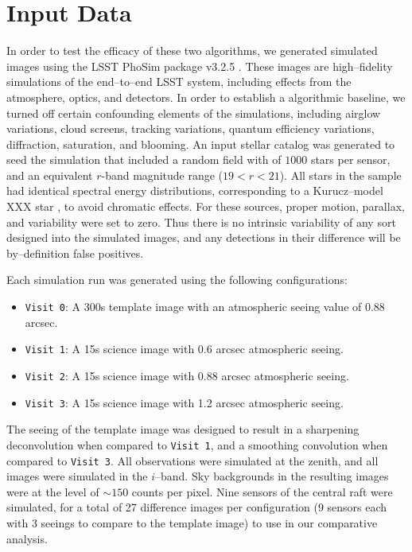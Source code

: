 \documentclass[floatfix, apj]{emulateapj}
\begin{document}
\section{Input Data}

In order to test the efficacy of these two algorithms, we generated simulated images using the LSST PhoSim package v3.2.5 \cite{phosim}.
These images are high--fidelity simulations of the end--to--end LSST system, including effects from the atmosphere, optics, and detectors.
In order to establish a algorithmic baseline, we turned off certain confounding elements of the simulations, including airglow variations, cloud screens, tracking variations, quantum efficiency variations, diffraction, saturation, and blooming.
An input stellar catalog was generated to seed the simulation that included a random field with of $1000$ stars per sensor, and an equivalent $r$-band magnitude range ($19<r<21$).
All stars in the sample had identical spectral energy distributions, corresponding to a Kurucz--model XXX star \cite{kurucz}, to avoid chromatic effects.
For these sources, proper motion, parallax, and variability were set to zero.
Thus there is no intrinsic variability of any sort designed into the simulated images, and any detections in their difference will be by--definition false positives.

Each simulation run was generated using the following configurations:
\begin{itemize}
\item {\tt Visit 0}: A 300s template image with an atmospheric seeing value of 0.88 arcsec.
\item {\tt Visit 1}: A 15s science image with 0.6 arcsec atmospheric seeing.
\item {\tt Visit 2}: A 15s science image with 0.88 arcsec atmospheric seeing.
\item {\tt Visit 3}: A 15s science image with 1.2 arcsec atmospheric seeing.
\end{itemize}
The seeing of the template image was designed to result in a sharpening deconvolution when compared to {\tt Visit 1}, and a smoothing convolution when compared to {\tt Visit 3}.
All observations were simulated at the zenith, and all images were simulated in the $i$--band.
Sky backgrounds in the resulting images were at the level of $\sim 150$ counts per pixel.
Nine sensors of the central raft were simulated, for a total of 27 difference images per configuration (9 sensors each with 3 seeings to compare to the template image) to use in our comparative analysis.
\end{document}
